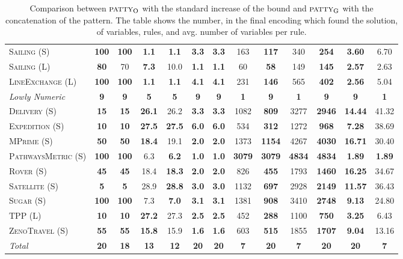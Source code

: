\documentclass[11pt]{article}
\begin{document}
\begin{table}[tb]
{\begin{tabular}{|l||cc||cc||cc||cc||cc||cc||}
\textsc{Sailing} (S)&\textbf{100}&\textbf{100}&\textbf{1.1}&\textbf{1.1}&\textbf{3.3}&\textbf{3.3}&163&\textbf{117}&340&\textbf{254}&\textbf{3.60}&6.70\\
\textsc{Sailing} (L)&\textbf{80}&70&\textbf{7.3}&10.0&\textbf{1.1}&\textbf{1.1}&60&\textbf{58}&149&\textbf{145}&\textbf{2.57}&2.63\\
\textsc{LineExchange} (L)&\textbf{100}&\textbf{100}&\textbf{1.1}&\textbf{1.1}&\textbf{4.1}&\textbf{4.1}&231&\textbf{146}&565&\textbf{402}&\textbf{2.56}&5.04
\\\hline
\textit{Lowly Numeric}&\textbf{9}&\textbf{9}&\textbf{5}&\textbf{5}&\textbf{9}&\textbf{9}&\textbf{1}&\textbf{9}&\textbf{1}&\textbf{9}&\textbf{9}&\textbf{1}\\\hline
\textsc{Delivery} (S)&\textbf{15}&\textbf{15}&\textbf{26.1}&26.2&\textbf{3.3}&\textbf{3.3}&1082&\textbf{809}&3277&\textbf{2946}&\textbf{14.44}&41.32\\
\textsc{Expedition} (S)&\textbf{10}&\textbf{10}&\textbf{27.5}&\textbf{27.5}&\textbf{6.0}&\textbf{6.0}&534&\textbf{312}&1272&\textbf{968}&\textbf{7.28}&38.69\\
\textsc{MPrime} (S)&\textbf{50}&\textbf{50}&\textbf{18.4}&19.1&\textbf{2.0}&\textbf{2.0}&1373&\textbf{1154}&4267&\textbf{4030}&\textbf{16.71}&30.40\\
\textsc{PathwaysMetric} (S)&\textbf{100}&\textbf{100}&6.3&\textbf{6.2}&\textbf{1.0}&\textbf{1.0}&\textbf{3079}&\textbf{3079}&\textbf{4834}&\textbf{4834}&\textbf{1.89}&\textbf{1.89}\\
\textsc{Rover} (S)&\textbf{45}&\textbf{45}&18.4&\textbf{18.3}&\textbf{2.0}&\textbf{2.0}&826&\textbf{455}&1793&\textbf{1460}&\textbf{16.25}&34.67\\
\textsc{Satellite} (S)&\textbf{5}&\textbf{5}&28.9&\textbf{28.8}&\textbf{3.0}&\textbf{3.0}&1132&\textbf{697}&2928&\textbf{2149}&\textbf{11.57}&36.43\\
\textsc{Sugar} (S)&\textbf{100}&\textbf{100}&7.3&\textbf{7.0}&\textbf{3.1}&\textbf{3.1}&1381&\textbf{908}&3410&\textbf{2748}&\textbf{9.13}&24.80\\
\textsc{TPP} (L)&\textbf{10}&\textbf{10}&\textbf{27.2}&27.3&\textbf{2.5}&\textbf{2.5}&452&\textbf{288}&1100&\textbf{750}&\textbf{3.25}&6.43\\
\textsc{ZenoTravel} (S)&\textbf{55}&\textbf{55}&\textbf{15.8}&15.9&\textbf{1.6}&\textbf{1.6}&603&\textbf{515}&1855&\textbf{1707}&\textbf{9.04}&13.16
\\\hline
\textit{Total}&\textbf{20}&\textbf{18}&\textbf{13}&\textbf{12}&\textbf{20}&\textbf{20}&\textbf{7}&\textbf{20}&\textbf{7}&\textbf{20}&\textbf{20}&\textbf{7}\\\hline

        \end{tabular}}
        \caption{Comparison between $\textsc{patty}_\mathrm{O}$ with the standard increase of the bound and $\textsc{patty}_\mathrm{G}$ with the concatenation of the pattern. The table shows the number, in the final encoding which found the solution, of variables, rules, and avg. number of variables per rule. }
        \label{tab:exp-search}
        \end{table}
        
\end{document}
